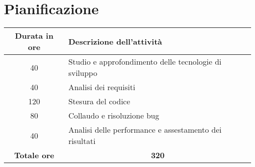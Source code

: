 
\section{Pianificazione}\label{sec:pianificazione}
\begin{tabularx}{\textwidth}{|c|X|}
    \hline
    \textbf{Durata in ore} & \textbf{Descrizione dell'attività} \\\hline
    40 & Studio e approfondimento delle tecnologie di sviluppo \\\hline
    40 & Analisi dei requisiti \\\hline
    120 & Stesura del codice \\\hline
    80 & Collaudo e risoluzione bug \\\hline
    40 & Analisi delle performance e assestamento dei risultati \\\hline
    \textbf{Totale ore} & \multicolumn{1}{|c|}{\textbf{320}} \\\hline
\end{tabularx}